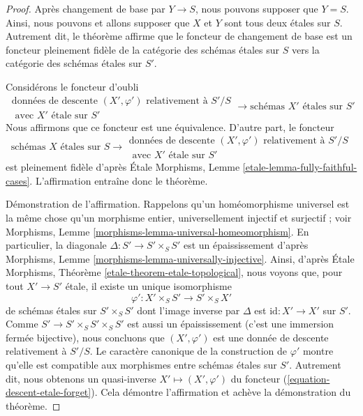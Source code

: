\begin{proof}
Apr\`es changement de base par $Y \to S$, nous pouvons supposer que $Y = S$.
Ainsi, nous pouvons et allons supposer que $X$ et $Y$ sont tous deux \'etales sur $S$.
Autrement dit, le th\'eor\`eme affirme que le foncteur de changement de base
est un foncteur pleinement fid\`ele de la cat\'egorie des sch\'emas \'etales
sur $S$ vers la cat\'egorie des sch\'emas \'etales sur $S'$.

\medskip\noindent
Consid\'erons le foncteur d'oubli
\begin{equation}
\label{equation-descent-etale-forget}
\begin{matrix}
\text{donn\'ees de descente }(X', \varphi')\text{ relativement \`a }S'/S \\
\text{ avec }X'\text{ \'etale sur }S'
\end{matrix}
\longrightarrow
\text{sch\'emas }X'\text{ \'etales sur }S'
\end{equation}
Nous affirmons que ce foncteur est une \'equivalence. D'autre part, le
foncteur
\begin{equation}
\label{equation-descent-etale}
\text{sch\'emas }X\text{ \'etales sur }S \longrightarrow
\begin{matrix}
\text{donn\'ees de descente }(X', \varphi')\text{ relativement \`a }S'/S \\
\text{ avec }X'\text{ \'etale sur }S'
\end{matrix}
\end{equation}
est pleinement fid\`ele d'apr\`es \'Etale Morphisms, Lemme
\ref{etale-lemma-fully-faithful-cases}.
L'affirmation entra\^ine donc le th\'eor\`eme.

\medskip\noindent
D\'emonstration de l'affirmation.
Rappelons qu'un hom\'eomorphisme universel est la m\^eme chose qu'un morphisme
entier, universellement injectif et surjectif ; voir
Morphisms, Lemme \ref{morphisms-lemma-universal-homeomorphism}.
En particulier, la diagonale $\Delta : S' \to S' \times_S S'$ est un \'epaississement
d'apr\`es Morphisms, Lemme \ref{morphisms-lemma-universally-injective}.
Ainsi, d'apr\`es \'Etale Morphisms, Th\'eor\`eme
\ref{etale-theorem-etale-topological},
nous voyons que, pour tout $X' \to S'$ \'etale, il existe un unique isomorphisme
$$
\varphi' : X' \times_S S' \to S' \times_S X'
$$
de sch\'emas \'etales sur $S' \times_S S'$ dont l'image inverse par
$\Delta$ est $\text{id} : X' \to X'$ sur $S'$.
Comme $S' \to S' \times_S S' \times_S S'$
est aussi un \'epaississement (c'est une immersion ferm\'ee bijective),
nous concluons que $(X', \varphi')$ est une donn\'ee de descente relativement \`a $S'/S$.
Le caract\`ere canonique de la construction de $\varphi'$ montre
qu'elle est compatible aux morphismes entre sch\'emas \'etales sur $S'$.
Autrement dit, nous obtenons un quasi-inverse
$X' \mapsto (X', \varphi')$ du foncteur
(\ref{equation-descent-etale-forget}). Cela d\'emontre l'affirmation et
ach\`eve la d\'emonstration du th\'eor\`eme.
\end{proof}


